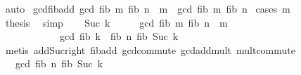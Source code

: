 \begin{isabellebody}
\isamarkupfalse%
\ auto%
\endisatagproof
{\isafoldproof}%
%
\isadelimproof
\isanewline
%
\endisadelimproof
\isanewline
{}\isamarkupfalse%
\ gcd{\isacharunderscore}{\kern0pt}fib{\isacharunderscore}{\kern0pt}add{\isacharcolon}{\kern0pt}\ {\isachardoublequoteopen}gcd\ {\isacharparenleft}{\kern0pt}fib\ m{\isacharparenright}{\kern0pt}\ {\isacharparenleft}{\kern0pt}fib\ {\isacharparenleft}{\kern0pt}n\ {\isacharplus}{\kern0pt}\ m{\isacharparenright}{\kern0pt}{\isacharparenright}{\kern0pt}\ {\isacharequal}{\kern0pt}\ gcd\ {\isacharparenleft}{\kern0pt}fib\ m{\isacharparenright}{\kern0pt}\ {\isacharparenleft}{\kern0pt}fib\ n{\isacharparenright}{\kern0pt}{\isachardoublequoteclose}\isanewline
%
\isadelimproof
%
\endisadelimproof
%
\isatagproof
{}\isamarkupfalse%
\ {\isacharparenleft}{\kern0pt}cases\ m{\isacharparenright}{\kern0pt}\isanewline
\ \ \isamarkupfalse%
\ {}\isanewline
\ \ \isamarkupfalse%
\ \isamarkupfalse%
\ {\isacharquery}{\kern0pt}thesis\ \isamarkupfalse%
\ simp\isanewline
{}\isamarkupfalse%
\isanewline
\ \ \isamarkupfalse%
\ {\isacharparenleft}{\kern0pt}Suc\ k{\isacharparenright}{\kern0pt}\isanewline
\ \ \isamarkupfalse%
\ \isamarkupfalse%
\ {\isachardoublequoteopen}gcd\ {\isacharparenleft}{\kern0pt}fib\ m{\isacharparenright}{\kern0pt}\ {\isacharparenleft}{\kern0pt}fib\ {\isacharparenleft}{\kern0pt}n\ {\isacharplus}{\kern0pt}\ m{\isacharparenright}{\kern0pt}{\isacharparenright}{\kern0pt}\isanewline
\ \ \ \ \ \ \ \ \ \ \ {\isacharequal}{\kern0pt}\ gcd\ {\isacharparenleft}{\kern0pt}fib\ k\ {\isacharasterisk}{\kern0pt}\ fib\ n{\isacharparenright}{\kern0pt}\ {\isacharparenleft}{\kern0pt}fib\ {\isacharparenleft}{\kern0pt}Suc\ k{\isacharparenright}{\kern0pt}{\isacharparenright}{\kern0pt}{\isachardoublequoteclose}\isanewline
\ \ \ \ \isamarkupfalse%
\ {\isacharparenleft}{\kern0pt}metis\ add{\isacharunderscore}{\kern0pt}Suc{\isacharunderscore}{\kern0pt}right\ fib{\isacharunderscore}{\kern0pt}add\ gcd{\isachardot}{\kern0pt}commute\ gcd{\isacharunderscore}{\kern0pt}add{\isacharunderscore}{\kern0pt}mult\ mult{\isachardot}{\kern0pt}commute{\isacharparenright}{\kern0pt}\isanewline
\ \ \isamarkupfalse%
\ \isamarkupfalse%
\ {\isachardoublequoteopen}{\isasymdots}\ {\isacharequal}{\kern0pt}\ gcd\ {\isacharparenleft}{\kern0pt}fib\ n{\isacharparenright}{\kern0pt}\ {\isacharparenleft}{\kern0pt}fib\ {\isacharparenleft}{\kern0pt}Suc\ k{\isacharparenright}{\kern0pt}{\isacharparenright}{\kern0pt}{\isachardoublequoteclose}\isanewline

\end{isabellebody}
